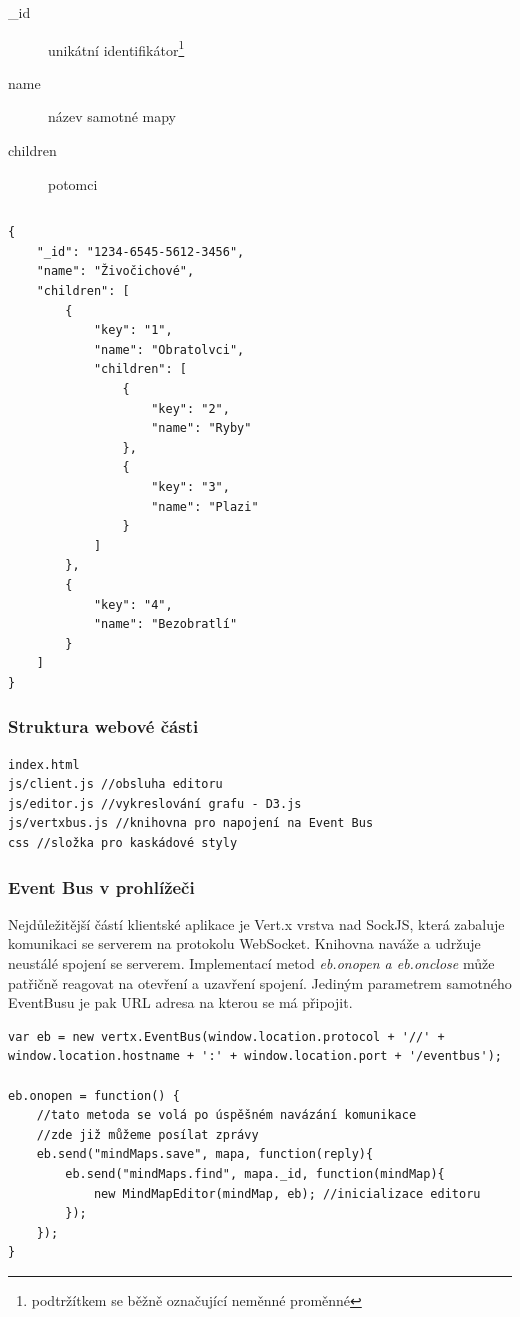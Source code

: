 \begin{description}
\item[\_id] unikátní identifikátor\footnote{podtržítkem se běžně označující neměnné proměnné}
\item[name] název samotné mapy
\item[children] potomci
\end{description}

\begin{lstlisting}
\end{lstlisting}

\begin{lstlisting}
{
	"_id": "1234-6545-5612-3456",
	"name": "Živočichové",
	"children": [
		{
			"key": "1",
			"name": "Obratolvci",
			"children": [
				{
					"key": "2",
					"name": "Ryby"
				},
				{
					"key": "3",
					"name": "Plazi"
				}
			]
		},
		{
			"key": "4",
			"name": "Bezobratlí"
		}
	]
}
\end{lstlisting}

\subsubsection{Struktura webové části}

\begin{lstlisting}
index.html
js/client.js //obsluha editoru
js/editor.js //vykreslování grafu - D3.js
js/vertxbus.js //knihovna pro napojení na Event Bus
css //složka pro kaskádové styly
\end{lstlisting}


\subsubsection{Event Bus v prohlížeči}

Nejdůležitější částí klientské aplikace je Vert.x vrstva nad SockJS\cite{sockjs}, která zabaluje komunikaci se serverem na protokolu WebSocket\cite{webSockets}. Knihovna naváže a udržuje neustálé spojení se serverem. Implementací metod \emph{eb.onopen a eb.onclose} může patřičně reagovat na otevření a uzavření spojení. Jediným parametrem samotného EventBusu je pak URL adresa na kterou se má připojit.

\begin{lstlisting}[caption=Připojení Event busu z prohlížeče a inicializace editoru]
var eb = new vertx.EventBus(window.location.protocol + '//' + window.location.hostname + ':' + window.location.port + '/eventbus');

eb.onopen = function() {
	//tato metoda se volá po úspěšném navázání komunikace
	//zde již můžeme posílat zprávy
	eb.send("mindMaps.save", mapa, function(reply){
		eb.send("mindMaps.find", mapa._id, function(mindMap){
			new MindMapEditor(mindMap, eb); //inicializace editoru
		});	
	});
}
\end{lstlisting}


